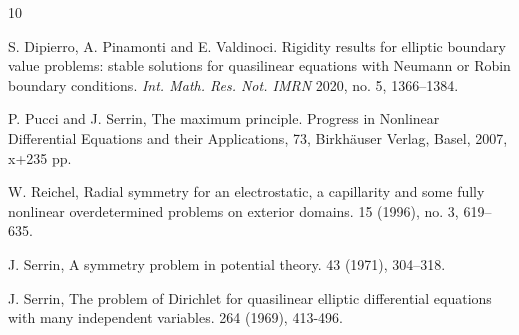 \documentclass[10 pt,a4paper]{article}
\theoremstyle{definition}
\begin{document}
\begin{thebibliography}{10}

 S. Dipierro, A. Pinamonti and E. Valdinoci. Rigidity results for elliptic boundary value problems: stable solutions for quasilinear equations with Neumann or Robin boundary conditions. \emph{Int. Math. Res. Not. IMRN} 2020, no. 5, 1366--1384.


 P. Pucci and J. Serrin, 
\newblock The maximum principle. 
\newblock Progress in Nonlinear Differential Equations and their Applications, 73, Birkh\"auser Verlag, Basel, 2007, x+235 pp.

W. Reichel, 
\newblock Radial symmetry for an electrostatic, a capillarity and some fully nonlinear overdetermined problems on exterior domains.
15 (1996), no. 3, 619--635.






J. Serrin, 
\newblock A symmetry problem in potential theory.
43 (1971), 304–318.

J. Serrin, 
\newblock The problem of Dirichlet for quasilinear elliptic differential equations with many independent variables.
264 (1969), 413-496.



\end{thebibliography}
\end{document}

